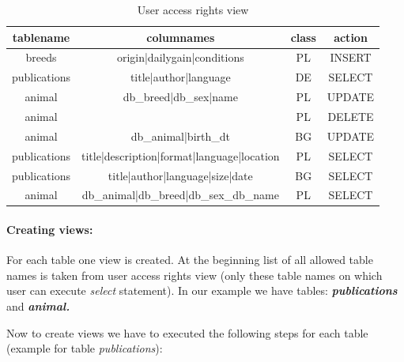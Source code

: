 \begin{center}%
\begin{table}[h]
\begin{center}\begin{tabular}{|c|c|c|c|}
\hline 
tablename&
columnames&
class&
action\tabularnewline
\hline
\hline 
breeds&
origin|dailygain|conditions&
PL&
INSERT\tabularnewline
\hline 
publications&
title|author|language&
DE&
SELECT\tabularnewline
\hline 
animal&
db\_breed|db\_sex|name&
PL&
UPDATE\tabularnewline
\hline 
animal&
&
PL&
DELETE\tabularnewline
\hline
animal&
db\_animal|birth\_dt&
BG&
UPDATE\tabularnewline
\hline
publications&
title|description|format|language|location&
PL&
SELECT\tabularnewline
\hline
publications&
title|author|language|size|date&
BG&
SELECT\tabularnewline
\hline
animal&
db\_animal|db\_breed|db\_sex\_db\_name&
PL&
SELECT\tabularnewline
\hline
\end{tabular}\end{center}
\caption{User access rights view}\label{userview2}
\end{table}
\end{center}

\paragraph{Creating views:}

For each table one view is created. At the beginning list of all allowed
table names is taken from user access rights view (only these table
names on which user can execute \emph{select} statement). In our
example we have tables: \textbf{\emph{publications}} and \textbf{\emph{animal.}}

\begin{flushleft}Now to create views we have to executed the following
steps for each table (example for table \emph{publications}):\end{flushleft}

